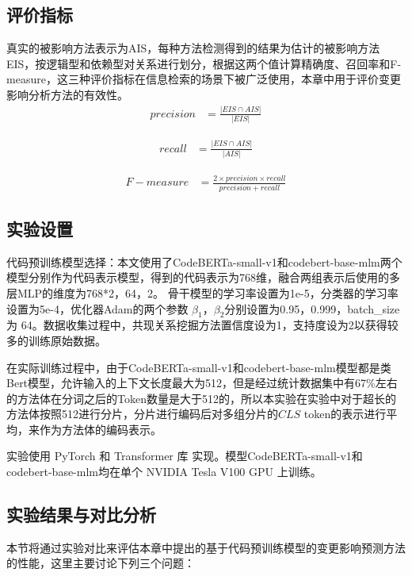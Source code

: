 \subsection{评价指标}\label{1_评价指标}

真实的被影响方法表示为AIS，每种方法检测得到的结果为估计的被影响方法EIS，按逻辑型和依赖型对关系进行划分，根据这两个值计算精确度、召回率和F-measure，这三种评价指标在信息检索的场景下被广泛使用，本章中用于评价变更影响分析方法的有效性。
\begin{align}
precision &= \frac{|EIS \cap AIS|}{|EIS|} 
\end{align}

\begin{align}
recall &= \frac{|EIS \cap AIS|}{|AIS|}  
\end{align}

\begin{align}
F-measure &= \frac{2 \times precision \times recall}{precision + recall} 
\end{align}


\subsection{实验设置}

代码预训练模型选择：本文使用了CodeBERTa-small-v1\cite{husain_codesearchnet_2019}和codebert-base-mlm\cite{feng2020codebert}两个模型分别作为代码表示模型，得到的代码表示为768维，融合两组表示后使用的多层MLP的维度为768*2，64，2。 骨干模型的学习率设置为1e-5，分类器的学习率设置为5e-4，优化器Adam的两个参数 $\beta_1$，$\beta_2$分别设置为0.95，0.999，batch\_size 为 64。数据收集过程中，共现关系挖掘方法置信度设为1，支持度设为2以获得较多的训练原始数据。

在实际训练过程中，由于CodeBERTa-small-v1和codebert-base-mlm模型都是类Bert模型，允许输入的上下文长度最大为512，但是经过统计数据集中有67\%左右的方法体在分词之后的Token数量是大于512的，所以本实验在实验中对于超长的方法体按照512进行分片，分片进行编码后对多组分片的$CLS$ token的表示进行平均，来作为方法体的编码表示。

实验使用 PyTorch \cite{paszke2019pytorch} 和 Transformer 库 \cite{wolf2020transformers}  实现。模型CodeBERTa-small-v1和codebert-base-mlm均在单个 NVIDIA Tesla V100 GPU 上训练。


\subsection{实验结果与对比分析}

本节将通过实验对比来评估本章中提出的基于代码预训练模型的变更影响预测方法的性能，这里主要讨论下列三个问题：

